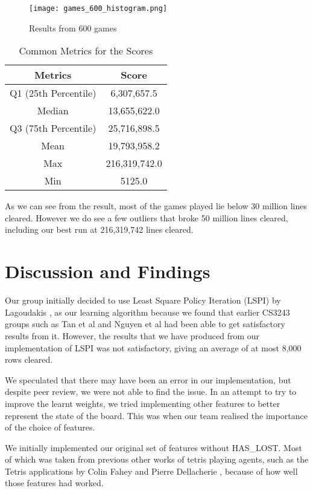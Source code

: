 \documentclass[a4paper,12pt,twocolumn]{article}
\begin{document}
\begin{figure}[h]
    \centering
    \texttt{[image: games\_600\_histogram.png]}
    \caption{Results from 600 games}
    \label{score_histogram}
\end{figure}

\begin{table}[h]
    \centering
	\begin{tabular}{|c|c|}
		\hline
		\textbf{Metrics}   & \textbf{Score}     \\
		\hline
		Q1 (25th Percentile)  & 6,307,657.5 \\
		\hline
		Median         & 13,655,622.0  \\
		\hline
		Q3 (75th Percentile)      & 25,716,898.5 \\
		\hline
		Mean & 19,793,958.2 \\
		\hline
		Max     & 216,319,742.0  \\
		\hline
		Min          & 5125.0 \\
		\hline
	\end{tabular}
	\caption{Common Metrics for the Scores}
	\label{metric_scores}
\end{table}

As we can see from the result, most of the games played lie below 30 million lines
cleared. However we do see a few outliers that broke 50 million lines cleared, including
our best run at 216,319,742 lines cleared.

\section{Discussion and Findings}
\label{discussion_n_findings}
Our group initially decided to use Least Square Policy Iteration (LSPI) by Lagoudakis \cite{lagoudakis},
as our learning algorithm because we found that earlier CS3243 groups such as
Tan et al \cite{shawntan} and Nguyen et al \cite{nhannguyen} had been able to get
satisfactory results from it. However, the results that we have produced from our
implementation of LSPI was not satisfactory, giving an average of at most 8,000 rows
cleared.

We speculated that there may have been an error in our implementation, but despite
peer review, we were not able to find the issue. In an attempt to try to improve the
learnt weights, we tried implementing other features to better represent the state
of the board. This was when our team realised the importance of the choice of features.

We initially implemented our original set of features without HAS\_LOST. Most of which
was taken from previous other works of tetris playing agents, such as the Tetris
applications by Colin Fahey and Pierre Dellacherie \cite{colin_fahey}, because of
how well those features had worked.
\end{document}
